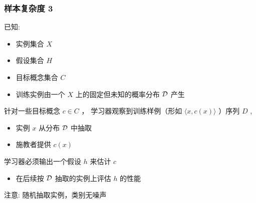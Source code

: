 \documentclass{beamer}
\begin{document}
\begin{frame}
\frametitle{样本复杂度 3}
\label{sec-2-4}


已知:
\begin{itemize}
\item 实例集合 $X$
\item 假设集合 $H$
\item 目标概念集合 $C$
\item 训练实例由一个 $X$ 上的固定但未知的概率分布  $\cal{D}$ 产生
\end{itemize}

针对一些目标概念 $c \in C$ ， 学习器观察到训练样例（形如 $\langle x, c(x) \rangle$ ）序列 $D$  , 
\begin{itemize}
\item 实例 $x$ 从分布  $\cal{D}$ 中抽取
\item 施教者提供 $c(x)$
\end{itemize}


学习器必须输出一个假设 $h$ 来估计 $c$
\begin{itemize}
\item 在后续按 $\cal{D}$ 抽取的实例上评估 $h$ 的性能
\end{itemize}


注意: 随机抽取实例，类别无噪声
\end{frame}
\end{document}
